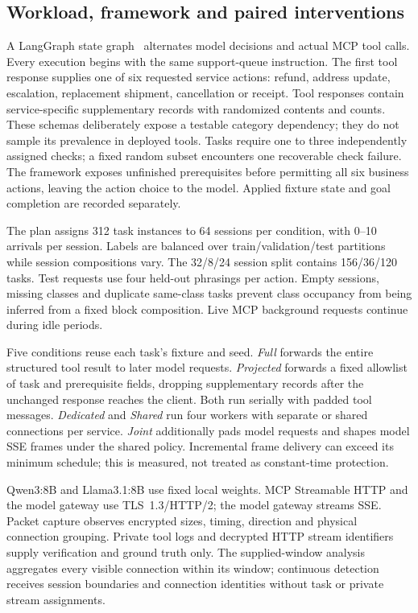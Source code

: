 \subsection{Workload, framework and paired interventions}\label{sec:live-study}
A LangGraph state graph~\cite{langchain2025langgraph} alternates model decisions and actual MCP tool calls. Every execution begins with the same support-queue instruction. The first tool response supplies one of six requested service actions: refund, address update, escalation, replacement shipment, cancellation or receipt. Tool responses contain service-specific supplementary records with randomized contents and counts. These schemas deliberately expose a testable category dependency; they do not sample its prevalence in deployed tools. Tasks require one to three independently assigned checks; a fixed random subset encounters one recoverable check failure. The framework exposes unfinished prerequisites before permitting all six business actions, leaving the action choice to the model. Applied fixture state and goal completion are recorded separately.

The plan assigns 312 task instances to 64 sessions per condition, with 0--10 arrivals per session. Labels are balanced over train/validation/test partitions while session compositions vary. The 32/8/24 session split contains 156/36/120 tasks. Test requests use four held-out phrasings per action. Empty sessions, missing classes and duplicate same-class tasks prevent class occupancy from being inferred from a fixed block composition. Live MCP background requests continue during idle periods.

Five conditions reuse each task's fixture and seed. \emph{Full} forwards the entire structured tool result to later model requests. \emph{Projected} forwards a fixed allowlist of task and prerequisite fields, dropping supplementary records after the unchanged response reaches the client. Both run serially with padded tool messages. \emph{Dedicated} and \emph{Shared} run four workers with separate or shared connections per service. \emph{Joint} additionally pads model requests and shapes model SSE frames under the shared policy. Incremental frame delivery can exceed its minimum schedule; this is measured, not treated as constant-time protection.

Qwen3:8B and Llama3.1:8B use fixed local weights. MCP Streamable HTTP and the model gateway use TLS~1.3/HTTP/2; the model gateway streams SSE. Packet capture observes encrypted sizes, timing, direction and physical connection grouping. Private tool logs and decrypted HTTP stream identifiers supply verification and ground truth only. The supplied-window analysis aggregates every visible connection within its window; continuous detection receives session boundaries and connection identities without task or private stream assignments.

